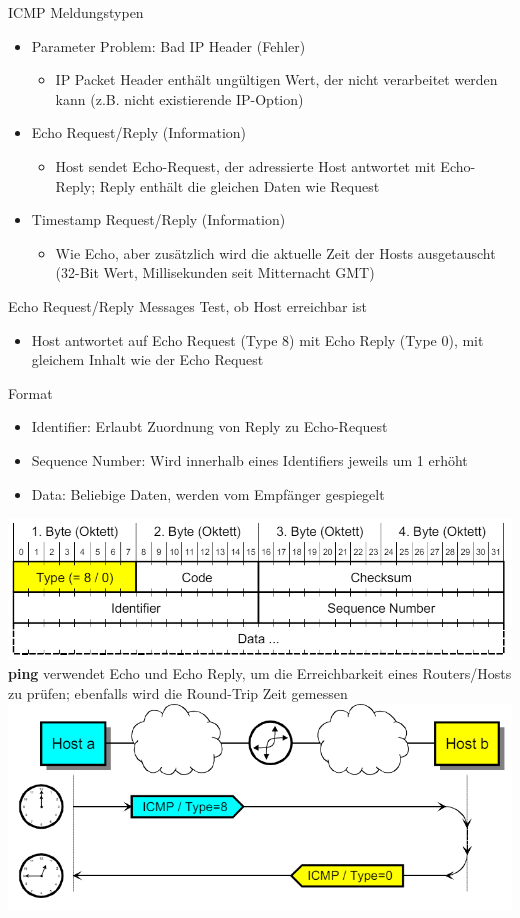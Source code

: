 \begin{definition}{ICMP Meldungstypen}
\begin{itemize}
        \item Parameter Problem: Bad IP Header (Fehler)
        \begin{itemize}
            \item IP Packet Header enthält ungültigen Wert, der nicht verarbeitet werden kann (z.B. nicht existierende IP-Option)
        \end{itemize}
        \item Echo Request/Reply (Information)
        \begin{itemize}
            \item Host sendet Echo-Request, der adressierte Host antwortet mit Echo-Reply; Reply enthält die gleichen Daten wie Request
        \end{itemize}
        \item Timestamp Request/Reply (Information)
        \begin{itemize}
            \item Wie Echo, aber zusätzlich wird die aktuelle Zeit der Hosts ausgetauscht (32-Bit Wert, Millisekunden seit Mitternacht GMT)
        \end{itemize}
    \end{itemize}
\end{definition}

\begin{definition}{Echo Request/Reply Messages}
    Test, ob Host erreichbar ist
    \begin{itemize}
        \item Host antwortet auf Echo Request (Type 8) mit Echo Reply (Type 0), mit gleichem Inhalt wie der Echo Request
    \end{itemize}
    Format
    \begin{itemize}
        \item Identifier: Erlaubt Zuordnung von Reply zu Echo-Request
        \item Sequence Number: Wird innerhalb eines Identifiers jeweils um 1 erhöht
        \item Data: Beliebige Daten, werden vom Empfänger gespiegelt
    \end{itemize}
        \includegraphics[width=0.75\linewidth]{images/icmp_echorequest.png}\\
    \textbf{ping} verwendet Echo und Echo Reply, um die Erreichbarkeit eines Routers/Hosts zu prüfen; ebenfalls wird die Round-Trip Zeit gemessen\\
        \includegraphics[width=0.5\linewidth]{images/ping.png}
\end{definition}

